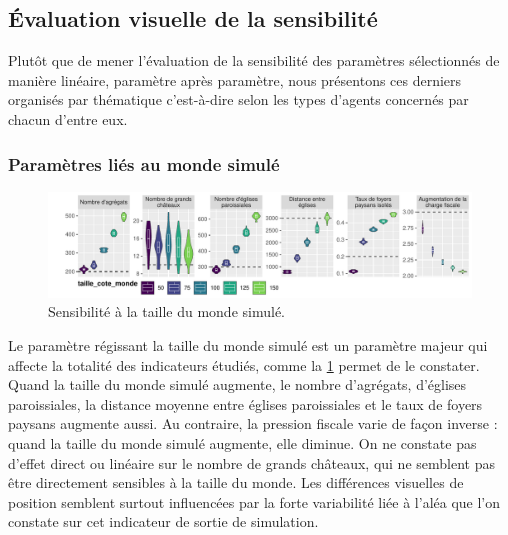\subsection{Évaluation visuelle de la sensibilité}


Plutôt que de mener l'évaluation de la sensibilité des paramètres sélectionnés de manière linéaire, paramètre après paramètre, nous présentons ces derniers organisés par thématique c'est-à-dire selon les types d'agents concernés par chacun d'entre eux.

\subsubsection{Paramètres liés au monde simulé}

\begin{figure}[H]
	\centering
	\includegraphics[width=\linewidth]{img/sensib/sensibilite_taille_cote_monde.pdf}
	\caption{Sensibilité à la taille du monde simulé.}
	\label{fig:sensib-monde}
\end{figure}


Le paramètre régissant la taille du monde simulé est un paramètre majeur qui affecte la totalité des indicateurs étudiés, comme la  \cref{fig:sensib-monde} permet de le constater.
Quand la taille du monde simulé augmente, le nombre d'agrégats, d'églises paroissiales, la distance moyenne entre églises paroissiales et le taux de foyers paysans augmente aussi.
Au contraire, la pression fiscale varie de façon inverse : quand la taille du monde simulé augmente, elle diminue.
On ne constate pas d'effet direct ou linéaire sur le nombre de grands châteaux, qui ne semblent pas être directement sensibles à la taille du monde.
Les différences visuelles de position semblent surtout influencées par la forte variabilité liée à l'aléa que l'on constate sur cet indicateur de sortie de simulation.

